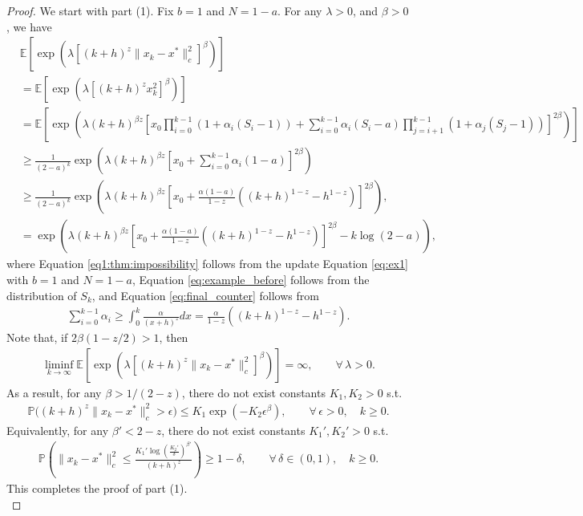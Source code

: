 \documentclass{article}
\begin{document}
\begin{proof}
We start with part (1). Fix $b=1$ and $N=1-a$. For any $\lambda>0$, and $\beta>0$, we have
\begin{align}
    &\mathbb{E}\left[\exp\left(\lambda \left[(k+h)^{z} \| x_k -x^* \|^2_c \right]^\beta\right)\right] \nonumber \\
    & = \mathbb{E}\left[\exp\left(\lambda \left[(k+h)^{z} x_k^2 \right]^\beta\right)\right] \nonumber \\
    & = \mathbb{E}\left[\exp\left(\lambda (k+h)^{{\beta}z} \left[ x_0 \prod_{i=0}^{k-1}(1+\alpha_i( S_i-1)) + \sum_{i=0}^{k-1} \alpha_i(S_i-a) \prod_{j=i+1}^{k-1} (1+\alpha_j(S_j-1)) \right]^{2\beta} \right) \right] \label{eq1:thm:impossibility} \\
    & \geq \frac{1}{(2-a)^k}\exp\left(\lambda (k+h)^{\beta z} \left[ x_0 + \sum_{i=0}^{k-1} \alpha_i(1-a) \right]^{2\beta}  \right) \label{eq:example_before} \\
    & \geq \frac{1}{(2-a)^k} \exp\left(\lambda (k+h)^{\beta z} \left[ x_0 + \frac{\alpha(1-a)}{1-z}((k+h)^{1-z}-h^{1-z}) \right]^{2\beta} \right), \label{eq:final_counter} \\
    & = \exp\left(\lambda (k+h)^{\beta z} \left[ x_0 + \frac{\alpha(1-a)}{1-z}((k+h)^{1-z}-h^{1-z}) \right]^{2\beta} - k \log(2-a) \right), \nonumber
\end{align}
where Equation \eqref{eq1:thm:impossibility} follows from the update Equation \eqref{eq:ex1} with $b=1$ and $N=1-a$, Equation \eqref{eq:example_before} follows from the distribution of $S_k$, and Equation \eqref{eq:final_counter} follows from
\begin{align*}
    \sum_{i=0}^{k-1}\alpha_i
    \geq \int_{0}^k\frac{\alpha}{(x+h)^z}dx
    = \frac{\alpha}{1-z}((k+h)^{1-z}-h^{1-z}).
\end{align*}
Note that, if $2\beta(1-z/2)>1$, then
\begin{align*}
        \liminf\limits_{k\to\infty} \mathbb{E}\left[\exp\left(\lambda \left[(k+h)^{z} \|x_k-x^*\|_c^2\right]^\beta\right)\right] = \infty, \qquad \forall\,\lambda>0.
\end{align*}
As a result, for any $\beta>1/(2-z)$, there do not exist constants $K_1,K_2>0$ s.t. 
\begin{align*}
    \mathbb{P}\Big((k+h)^z \|x_k-x^*\|_c^2 > \epsilon \Big) \leq K_1\exp\left(-K_2\epsilon^\beta\right), \qquad \forall\,\epsilon>0, \quad k\geq 0.
\end{align*}
Equivalently, for any $\beta'<2-z$, there do not exist constants $K_1',K_2'>0$ s.t. 
\begin{align*}
    \mathbb{P}\left(\|x_k-x^*\|_c^2 \leq \frac{K_1'\log\left(\frac{K_2'}{\delta}\right)^{\beta'}}{(k+h)^z} \right) \geq 1- \delta,\qquad \forall\,\delta\in(0,1), \quad k\geq 0.
\end{align*}
This completes the proof of part (1).\\


\end{proof}
\end{document}

